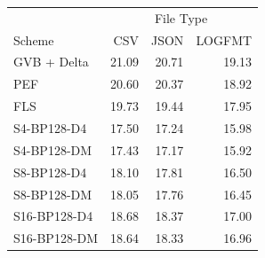 \begin{tabular}{lrrr}
\toprule
 & \multicolumn{3}{c}{File Type} \\
Scheme & CSV & JSON & LOGFMT \\
\midrule
GVB + Delta & 21.09 & 20.71 & 19.13 \\
PEF & 20.60 & 20.37 & 18.92 \\
FLS & 19.73 & 19.44 & 17.95 \\
S4-BP128-D4 & 17.50 & 17.24 & 15.98 \\
S4-BP128-DM & 17.43 & 17.17 & 15.92 \\
S8-BP128-D4 & 18.10 & 17.81 & 16.50 \\
S8-BP128-DM & 18.05 & 17.76 & 16.45 \\
S16-BP128-D4 & 18.68 & 18.37 & 17.00 \\
S16-BP128-DM & 18.64 & 18.33 & 16.96 \\
\bottomrule
\end{tabular}
